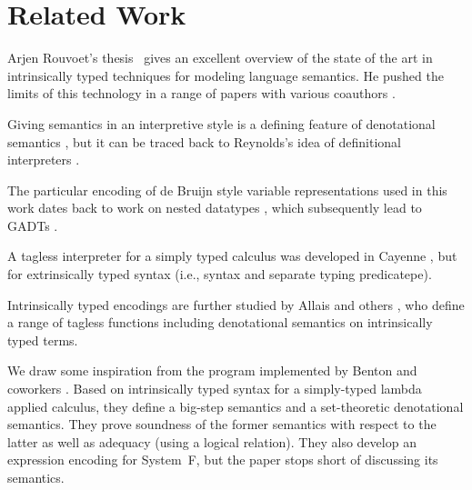 \documentclass[acmsmall,anonymous,review,screen]{acmart}
\begin{document}


\section{Related Work}
\label{sec:related-work}

Arjen Rouvoet's thesis~\cite{DBLP:phd/basesearch/Rouvoet21} gives an
excellent overview of the state of the art in intrinsically typed
techniques for modeling language semantics. He pushed the limits of
this technology in a range of papers with various coauthors
\cite{DBLP:journals/pacmpl/RestPRVM22,DBLP:journals/pacmpl/RouvoetKV21,DBLP:conf/cpp/RouvoetPKV20,DBLP:journals/pacmpl/PoulsenRTKV18}. 

Giving semantics in an interpretive style is a defining feature of
denotational semantics \cite{Schmidt1986}, but it can be traced back
to Reynolds's idea of definitional interpreters \cite{Reynolds1975}.

The particular encoding of de Bruijn style variable representations
used in this work dates back to work on nested datatypes
\cite{DBLP:conf/mpc/BirdM98,DBLP:journals/jfp/BirdP99,DBLP:conf/csl/AltenkirchR99},
which subsequently lead to GADTs
\cite{cheney03:_first_class_phant_types}.

A tagless interpreter for a simply typed calculus was developed in
Cayenne \cite{augustsson99}, but for extrinsically typed syntax (i.e.,
syntax and separate typing predicatepe).

Intrinsically typed encodings are further studied by Allais and others
\cite{DBLP:conf/cpp/Allais0MM17}, who define a range of tagless
functions including denotational semantics on intrinsically typed
terms. 

We draw some inspiration from the program implemented by Benton and coworkers
\cite{DBLP:journals/jar/BentonHKM12}. Based on intrinsically typed
syntax for a simply-typed lambda applied calculus, they define a
big-step semantics and a set-theoretic denotational semantics. They
prove soundness of the former semantics with respect to the latter as
well as adequacy (using a logical relation). They also develop an
expression encoding for System~F, but the paper stops short of
discussing its semantics. 
\end{document}
